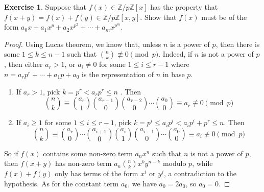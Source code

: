 \documentclass{article}
\theoremstyle{definition}
\newtheorem{exercise}{Exercise}
\begin{document}
\newpage

\begin{exercise}
Suppose that $f(x) \in \mathbb{Z}/p\mathbb{Z}[x]$ has the property that $f(x + y) = f(x) + f(y) \in \mathbb{Z}/p \mathbb{Z}[x, y]$. Show that $f(x)$ must be of the form $a_0 x + a_1 x^p + a_2 x^{p^2} + \cdots + a_m x^{p^m}$.
\end{exercise}
\begin{proof}
Using Lucas theorem, we know that, unless $n$ is a power of $p$, then there is some $1 \leq k \leq n-1$ such that ${n \choose k} \not\equiv 0 \pmod{p}$. Indeed, if $n$ is not a power of $p$, then either $a_r > 1$, or $a_i \neq 0$ for some $1 \leq i \leq r - 1$ where $n = a_r p^r + \cdots + a_1 p + a_0$ is the representation of $n$ in base $p$.
\begin{enumerate}
	\item If $a_r > 1$, pick $k = p^r < a_r p^r \leq n$ . Then
	$${n \choose k} \equiv {a_r \choose 1} {a_{r - 1} \choose 0} {a_{r - 2} \choose 0} \cdots {a_0 \choose 0} \equiv a_r \not\equiv 0 \pmod{p}$$
	\item If $a_i \geq 1$ for some $1 \leq i \leq r - 1$, pick $k = p^i \leq a_i p^i < a_i p^i + p^r \leq n$. Then
	$${n \choose k} \equiv {a_r \choose 0} \cdots {a_{i + 1} \choose 0} {a_i \choose 1} {a_{i - 1} \choose 0} \cdots {a_0 \choose 0} \equiv a_i \not\equiv 0 \pmod{p}$$
\end{enumerate}
So if $f(x)$ contains some non-zero term $a_n x^n$ such that $n$ is not a power of $p$, then $f(x + y)$ has non-zero term $a_n {n \choose k} x^k y^{n - k}$ modulo $p$, while $f(x) + f(y)$ only has terms of the form $x^i$ or $y^j$, a contradiction to the hypothesis. As for the constant term $a_0$, we have $a_0 = 2 a_0$, so $a_0 = 0$.
\end{proof}
\end{document}
